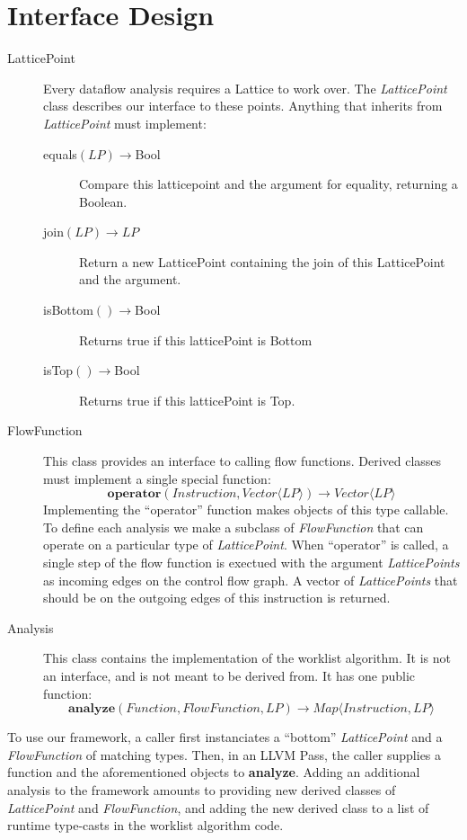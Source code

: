 \documentclass{article}
\theoremstyle{definition}
\begin{document}
\section{Interface Design}
\begin{description}
\item[LatticePoint] Every dataflow analysis requires a Lattice to work
  over. The \emph{LatticePoint} class describes our interface to these
  points. Anything that inherits from \emph{LatticePoint} must
  implement:
  \begin{description}
  \item[equals$(LP) \rightarrow $Bool] Compare this latticepoint and
    the argument for equality, returning a Boolean.
  \item[join$(LP) \rightarrow LP$] Return a new LatticePoint
    containing the join of this LatticePoint and the argument.
  \item[isBottom$() \rightarrow $Bool] Returns true if this
    latticePoint is Bottom
  \item[isTop$() \rightarrow $Bool] Returns true if this latticePoint
    is Top.
  \end{description}
\item[FlowFunction] This class provides an interface to calling flow
  functions. Derived classes must implement a single special function:
  \[
  \textbf{operator}(Instruction, Vector \langle LP\rangle) \rightarrow
  Vector \langle LP \rangle
  \]
  Implementing the ``operator'' function makes objects of this type
  callable. To define each analysis we make a subclass of
  \emph{FlowFunction} that can operate on a particular type of
  \emph{LatticePoint}. When ``operator'' is called, a single step of
  the flow function is exectued with the argument \emph{LatticePoints}
  as incoming edges on the control flow graph. A vector of
  \emph{LatticePoints} that should be on the outgoing edges of this
  instruction is returned.
\item[Analysis] This class contains the implementation of the worklist
  algorithm. It is not an interface, and is not meant to be derived
  from. It has one public function:
  \[
  \textbf{analyze}(Function, FlowFunction, LP) \rightarrow
  Map \langle Instruction, LP \rangle
  \]
\end{description}




To use our framework, a caller first instanciates a ``bottom''
\emph{LatticePoint} and a \emph{FlowFunction} of matching types. Then,
in an LLVM Pass, the caller supplies a function and the aforementioned
objects to \textbf{analyze}. Adding an additional analysis to the
framework amounts to providing new derived classes of
\emph{LatticePoint} and \emph{FlowFunction}, and adding the new
derived class to a list of runtime type-casts in the worklist
algorithm code.
\end{document}
